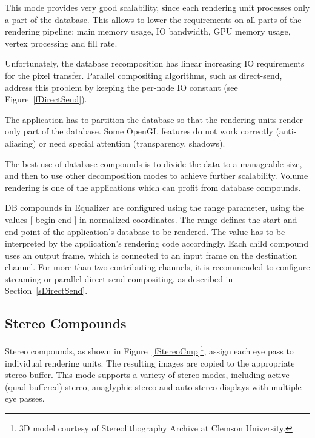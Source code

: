 \documentclass[10pt,a4]{scrartcl}
\newcommand{\fig}[1]{Figure~\ref{#1}}
\newcommand{\sref}[1]{Section~\ref{#1}}
\begin{document}
This mode provides very good scalability, since each rendering unit
processes only a part of the database. This allows to lower the
requirements on all parts of the rendering pipeline: main memory usage,
IO bandwidth, GPU memory usage, vertex processing and fill rate.

Unfortunately, the database recomposition has linear increasing IO
requirements for the pixel transfer. Parallel compositing algorithms,
such as direct-send, address this problem by keeping the per-node IO
constant (see \fig{fDirectSend}).

The application has to partition the database so that the rendering units render
only part of the database. Some OpenGL features do not work correctly
(anti-aliasing) or need special attention (transparency, shadows).

The best use of database compounds is to divide the data to a manageable
size, and then to use other decomposition modes to achieve further
scalability. Volume rendering is one of the applications which can
profit from database compounds.

DB compounds in Equalizer are configured using the \textsf{range}
parameter, using the values \textsf{[ begin end ]} in normalized
coordinates. The range defines the start and end point of the
application's database to be rendered. The value has to be interpreted
by the application's rendering code accordingly.  Each child compound
uses an output frame, which is connected to an input frame on the
destination channel. For more than two contributing channels, it is
recommended to configure streaming or parallel direct send compositing,
as described in \sref{sDirectSend}.


\subsection{Stereo Compounds}

Stereo compounds, as shown in \fig{fStereoCmp}\footnote{3D model
  courtesy of Stereolithography Archive at Clemson University.}, assign
each eye pass to individual rendering units. The resulting images are
copied to the appropriate stereo buffer. This mode supports a variety of
stereo modes, including active (quad-buffered) stereo, anaglyphic stereo
and auto-stereo displays with multiple eye passes.
\end{document}
